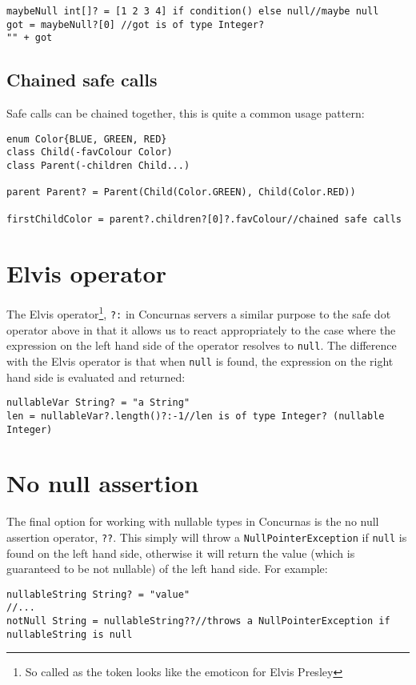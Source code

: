 \documentclass[conc-doc]{subfiles}
\begin{document}
\begin{lstlisting}
maybeNull int[]? = [1 2 3 4] if condition() else null//maybe null
got = maybeNull?[0] //got is of type Integer?
"" + got
\end{lstlisting}


\subsection{Chained safe calls}
Safe calls can be chained together, this is quite a common usage pattern:

\begin{lstlisting}
enum Color{BLUE, GREEN, RED}
class Child(-favColour Color)
class Parent(-children Child...)

parent Parent? = Parent(Child(Color.GREEN), Child(Color.RED))

firstChildColor = parent?.children?[0]?.favColour//chained safe calls
\end{lstlisting}

\section{Elvis operator}
The Elvis operator\footnote{So called as the token looks like the emoticon for Elvis Presley}, \lstinline{?:} in Concurnas servers a similar purpose to the safe dot operator above in that it allows us to react appropriately to the case where the expression on the left hand side of the operator resolves to \lstinline{null}. The difference with the Elvis operator is that when \lstinline{null} is found, the expression on the right hand side is evaluated and returned:

\begin{lstlisting}
nullableVar String? = "a String"
len = nullableVar?.length()?:-1//len is of type Integer? (nullable Integer)
\end{lstlisting}

\section{No null assertion}
The final option for working with nullable types in Concurnas is the no null assertion operator, \lstinline{??}. This simply will throw a \lstinline{NullPointerException} if \lstinline{null} is found on the left hand side, otherwise it will return the value (which is guaranteed to be not nullable) of the left hand side. For example:

\begin{lstlisting}
nullableString String? = "value"
//...
notNull String = nullableString??//throws a NullPointerException if nullableString is null
\end{lstlisting}
\end{document}
